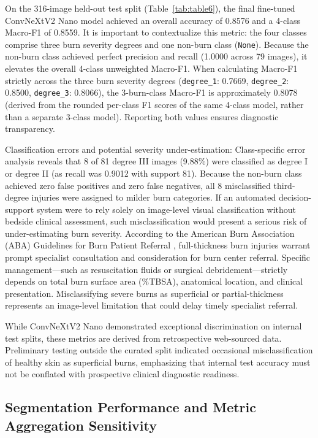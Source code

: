 \documentclass[11pt,a4paper]{article}
\begin{document}
On the 316-image held-out test split (Table~\ref{tab:table6}), the final fine-tuned ConvNeXtV2 Nano model achieved an overall accuracy of 0.8576 and a 4-class Macro-F1 of 0.8559. It is important to contextualize this metric: the four classes comprise three burn severity degrees and one non-burn class (\texttt{None}). Because the non-burn class achieved perfect precision and recall (1.0000 across 79 images), it elevates the overall 4-class unweighted Macro-F1. When calculating Macro-F1 strictly across the three burn severity degrees (\texttt{degree\_1}: 0.7669, \texttt{degree\_2}: 0.8500, \texttt{degree\_3}: 0.8066), the 3-burn-class Macro-F1 is approximately 0.8078 (derived from the rounded per-class F1 scores of the same 4-class model, rather than a separate 3-class model). Reporting both values ensures diagnostic transparency.

Classification errors and potential severity under-estimation: Class-specific error analysis reveals that 8 of 81 degree III images (9.88\%) were classified as degree I or degree II (as recall was 0.9012 with support 81). Because the non-burn class achieved zero false positives and zero false negatives, all 8 misclassified third-degree injuries were assigned to milder burn categories. If an automated decision-support system were to rely solely on image-level visual classification without bedside clinical assessment, such misclassification would present a serious risk of under-estimating burn severity. According to the American Burn Association (ABA) Guidelines for Burn Patient Referral \cite{aba2018}, full-thickness burn injuries warrant prompt specialist consultation and consideration for burn center referral. Specific management---such as resuscitation fluids or surgical debridement---strictly depends on total burn surface area (\%TBSA), anatomical location, and clinical presentation. Misclassifying severe burns as superficial or partial-thickness represents an image-level limitation that could delay timely specialist referral.

While ConvNeXtV2 Nano demonstrated exceptional discrimination on internal test splits, these metrics are derived from retrospective web-sourced data. Preliminary testing outside the curated split indicated occasional misclassification of healthy skin as superficial burns, emphasizing that internal test accuracy must not be conflated with prospective clinical diagnostic readiness.

\subsection{Segmentation Performance and Metric Aggregation Sensitivity}
\end{document}
